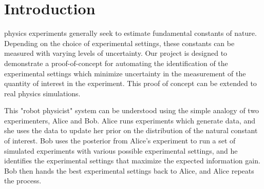 \documentclass[10pt,journal,compsoc]{IEEEtran}
\begin{document}
\ifCLASSOPTIONcompsoc
{}
\else
\section{Introduction}
\label{sec:introduction}
\fi




% 
% 
% 
% 
 physics experiments generally seek to estimate fundamental constants of nature. Depending on the choice of experimental settings, these constants can be measured with varying levels of uncertainty. Our project is designed to demonstrate a proof-of-concept for automating the identification of the experimental settings which minimize uncertainty in the measurement of the quantity of interest in the experiment. This proof of concept can be extended to real physics simulations.

This "robot physicist" system can be understood using the simple analogy of two experimenters, Alice and Bob. Alice runs experiments which generate data, and she uses the data to update her prior on the distribution of the natural constant of interest. Bob uses the posterior from Alice's experiment to run a set of simulated experiments with various possible experimental settings, and he identifies the experimental settings that maximize the expected information gain. Bob then hands the best experimental settings back to Alice, and Alice repeats the process.
\end{document}
